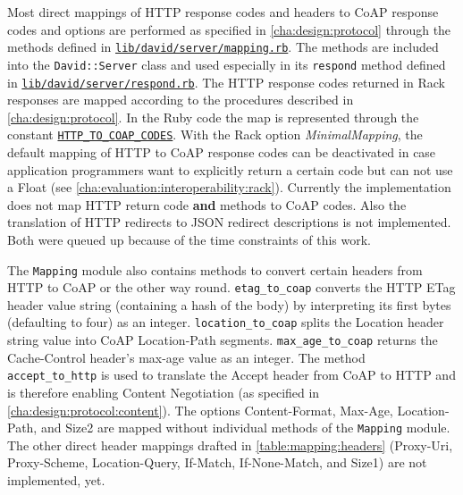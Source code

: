 		Most direct mappings of \ac{HTTP} response codes and headers to
		\ac{CoAP} response codes and options are performed as specified in
		\autoref{cha:design:protocol} through the methods defined in
		\href{https://github.com/nning/david/blob/0.4.3/lib/david/server/mapping.rb}{\texttt{lib/david/server/mapping.rb}}.
		The methods are included into the \texttt{David::Server} class and used
		especially in its \texttt{respond} method defined in
		\href{https://github.com/nning/david/blob/0.4.3/lib/david/server/respond.rb}{\texttt{lib/david/server/respond.rb}}.
		The \ac{HTTP} response codes returned in Rack responses are mapped
		according to the procedures described in \autoref{cha:design:protocol}.
		In the Ruby code the map is represented through the constant
		\href{https://github.com/nning/david/blob/0.4.3/lib/david/server/mapping.rb#L6}{\texttt{HTTP\_TO\_COAP\_CODES}}.
		With the Rack option \emph{MinimalMapping}, the default mapping of
		\ac{HTTP} to \ac{CoAP} response codes can be deactivated in case
		application programmers want to explicitly return a certain code but
		can not use a Float (see
		\autoref{cha:evaluation:interoperability:rack}). Currently the
		implementation does not map \ac{HTTP} return code \textbf{and} methods
		to \ac{CoAP} codes. Also the translation of \ac{HTTP} redirects to
		\ac{JSON} redirect descriptions is not implemented. Both were queued up
		because of the time constraints of this work.
		
		The \texttt{Mapping} module also contains methods to convert certain
		headers from \ac{HTTP} to \ac{CoAP} or the other way round.
		\texttt{etag\_to\_coap} converts the \ac{HTTP} ETag header value string
		(containing a hash of the body) by interpreting its first bytes
		(defaulting to four) as an integer. \texttt{location\_to\_coap} splits
		the Location header string value into \ac{CoAP} Location-Path segments.
		\texttt{max\_age\_to\_coap} returns the Cache-Control header's max-age
		value as an integer. The method \texttt{accept\_to\_http} is used to
		translate the Accept header from \ac{CoAP} to \ac{HTTP} and is
		therefore enabling Content Negotiation (as specified in
		\autoref{cha:design:protocol:content}). The options Content-Format,
		Max-Age, Location-Path, and Size2 are mapped without individual methods
		of the \texttt{Mapping} module. The other direct header mappings
		drafted in \autoref{table:mapping:headers} (Proxy-Uri, Proxy-Scheme,
		Location-Query, If-Match, If-None-Match, and Size1) are not
		implemented, yet.

